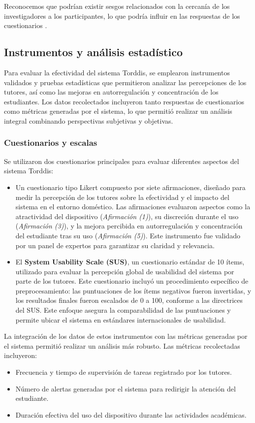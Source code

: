 \documentclass[a4paper,fleqn]{cas-sc}
\begin{document}
			Reconocemos que podrían existir sesgos relacionados con la cercanía de los investigadores a los participantes, lo que podría influir en las respuestas de los cuestionarios \citep{DiPietro2025Meta}.
		
		\subsection{Instrumentos y análisis estadístico}
			Para evaluar la efectividad del sistema Torddis, se emplearon instrumentos validados y pruebas estadísticas que permitieron analizar las percepciones de los tutores, así como las mejoras en autorregulación y concentración de los estudiantes. Los datos recolectados incluyeron tanto respuestas de cuestionarios como métricas generadas por el sistema, lo que permitió realizar un análisis integral combinando perspectivas subjetivas y objetivas.
			
			\subsubsection{Cuestionarios y escalas}
				Se utilizaron dos cuestionarios principales para evaluar diferentes aspectos del sistema Torddis:
				\begin{itemize}
					\item Un cuestionario tipo Likert compuesto por siete afirmaciones, diseñado para medir la percepción de los tutores sobre la efectividad y el impacto del sistema en el entorno doméstico. Las afirmaciones evaluaron aspectos como la atractividad del dispositivo (\textit{Afirmación (1)}), su discreción durante el uso (\textit{Afirmación (3)}), y la mejora percibida en autorregulación y concentración del estudiante tras su uso (\textit{Afirmación (5)}). Este instrumento fue validado por un panel de expertos para garantizar su claridad y relevancia.
					\item El \textbf{System Usability Scale (SUS)}, un cuestionario estándar de 10 ítems, utilizado para evaluar la percepción global de usabilidad del sistema por parte de los tutores. Este cuestionario incluyó un procedimiento específico de preprocesamiento: las puntuaciones de los ítems negativos fueron invertidas, y los resultados finales fueron escalados de 0 a 100, conforme a las directrices del SUS. Este enfoque asegura la comparabilidad de las puntuaciones y permite ubicar el sistema en estándares internacionales de usabilidad.
				\end{itemize}
				
				La integración de los datos de estos instrumentos con las métricas generadas por el sistema permitió realizar un análisis más robusto. Las métricas recolectadas incluyeron:
				\begin{itemize}
					\item Frecuencia y tiempo de supervisión de tareas registrado por los tutores.
					\item Número de alertas generadas por el sistema para redirigir la atención del estudiante.
					\item Duración efectiva del uso del dispositivo durante las actividades académicas.
				\end{itemize}
				
\end{document}
